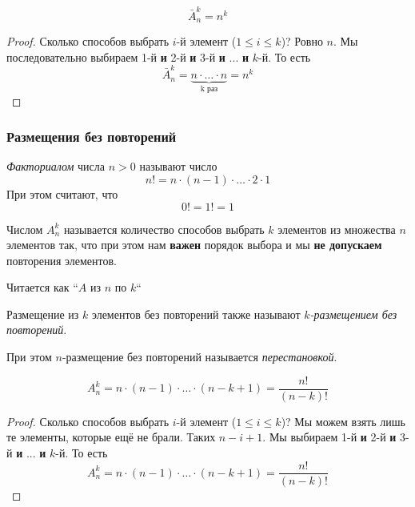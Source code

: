 \begin{theorem}
	\[
		\bar{A}_n^k = n^k
	\]
\end{theorem}

\begin{proof}
	Сколько способов выбрать $i$-й элемент ($1 \le i \le k$)? Ровно $n$. Мы последовательно выбираем 1-й \textbf{и} 2-й \textbf{и} 3-й \textbf{и} ... \textbf{и} $k$-й. То есть
	\[
		\bar{A}_n^k = \underbrace{n \cdot \ldots \cdot n}_{\text{k раз}} = n^k
	\]
\end{proof}

\subsubsection*{Размещения без повторений}

\begin{definition}
	\textit{Факториалом} числа $n > 0$ называют число
	\[
		n! = n \cdot (n - 1) \cdot \ldots \cdot 2 \cdot 1
	\]
	При этом считают, что
	\[
		0! = 1! = 1
	\]
\end{definition}

\begin{definition}
	Числом $A_n^k$ называется количество способов выбрать $k$ элементов из множества $n$ элементов так, что при этом нам \textbf{важен} порядок выбора и мы \textbf{не допускаем} повторения элементов.
\end{definition}

\begin{note}
	Читается как ``$A$ из $n$ по $k$``
\end{note}

\begin{note}
	Размещение из $k$ элементов без повторений также называют \textit{$k$-размещением без повторений}.
	
	При этом $n$-размещение без повторений называется \textit{перестановкой}.
\end{note}

\begin{theorem}
	\[
		A_n^k = n \cdot (n - 1) \cdot \ldots \cdot (n - k + 1) = \frac{n!}{(n - k)!}
	\]
\end{theorem}

\begin{proof}
	Сколько способов выбрать $i$-й элемент ($1 \le i \le k$)? Мы можем взять лишь те элементы, которые ещё не брали. Таких $n - i + 1$. Мы выбираем 1-й \textbf{и} 2-й \textbf{и} 3-й \textbf{и} ... \textbf{и} $k$-й. То есть
	\[
		A_n^k = n \cdot (n - 1) \cdot \ldots \cdot (n - k + 1) = \frac{n!}{(n - k)!}
	\]
\end{proof}

